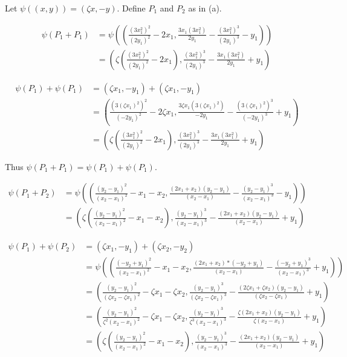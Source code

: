 \documentclass{article}
\begin{document}
Let $\psi((x,y)) = (\zeta x, -y)$. Define $P_1$ and $P_2$ as in (a).

\begin{align*}
\psi(P_1+P_1) &=
\psi \left(
	\left(
		\frac{(3x_1^2)^2}{(2y_1)^2}-2x_1,
		\frac{3x_1(3x_1^2)}{2y_1}-\frac{(3x_1^2)^3}{(2y_1)^3}-y_1
	\right)
\right) \\
&= \left(
	\zeta \left(\frac{(3x_1^2)^2}{(2y_1)^2}-2x_1 \right),
	\frac{(3x_1^2)^3}{(2y_1)^3} - \frac{3x_1(3x_1^2)}{2y_1} + y_1
\right)
\end{align*}

\begin{align*}
\psi(P_1)+\psi(P_1) &= (\zeta x_1,-y_1) + (\zeta x_1,-y_1) \\
&= \left(
	\frac{(3(\zeta x_1)^2)^2}{(-2y_1)^2}-2\zeta x_1,
	\frac{3\zeta x_1(3(\zeta x_1)^2)}{-2y_1}-\frac{(3 (\zeta x_1)^2)^3}{(-2y_1)^3}+y_1
\right) \\
&= \left(
	\zeta \left( \frac{(3x_1^2)^2}{(2y_1)^2}-2x_1 \right),
	\frac{(3x_1^2)^3}{(2y_1)^3} - \frac{3x_1(3x_1^2)}{2y_1} + y_1
\right)
\end{align*}

Thus $\psi(P_1+P_1) = \psi(P_1) + \psi(P_1)$.

\begin{align*}
\psi(P_1+P_2) &= 
\psi \left(
	\left(
		\frac{(y_2-y_1)^2}{(x_2-x_1)^2}-x_1-x_2,
		\frac{(2x_1+x_2)(y_2-y_1)}{(x_2-x_1)}-\frac{(y_2-y_1)^3}{(x_2-x_1)^3}-y_1
	\right)
\right) \\
&= \left(
	\zeta \left(\frac{(y_2-y_1)^2}{(x_2-x_1)^2}-x_1-x_2\right),
	\frac{(y_2-y_1)^3}{(x_2-x_1)^3} - \frac{(2x_1+x_2)(y_2-y_1)}{(x_2-x_1)} + y_1
\right)
\end{align*}

\begin{align*}
\psi(P_1) + \psi(P_2) &= (\zeta x_1, -y_1) + (\zeta x_2, -y_2) \\
&=
\psi\left( 
	\left(
		\frac{(-y_2+y_1)^2}{( x_2 -  x_1)^2}- x_1-  x_2,
		\frac{(2 x_1+ x_2)*(-y_2+y_1)}{(x_2-x_1)}-\frac{(-y_2+y_1)^3}{( x_2- x_1)^3}+y_1
	\right)
\right) \\
&= \left(
	\frac{(y_2-y_1)^2}{(\zeta x_2-\zeta x_1)^2}-\zeta x_1-\zeta x_2,
	\frac{(y_2-y_1)^3}{(\zeta x_2-\zeta x_1)^3} - \frac{(2\zeta x_1+\zeta x_2)(y_2-y_1)}{(\zeta x_2-\zeta x_1)} + y_1
\right)
\\
&=
\left(
	\frac{(y_2-y_1)^2}{\zeta^2(x_2-x_1)^2}-\zeta x_1-\zeta x_2,
	\frac{(y_2-y_1)^3}{\zeta^3(x_2-x_1)^3} - \frac{\zeta(2x_1+x_2)(y_2-y_1)}{\zeta(x_2-x_1)} + y_1
\right) \\
&=
\left(
	\zeta \left( \frac{(y_2-y_1)^2}{(x_2-x_1)^2}-x_1-x_2 \right),
	\frac{(y_2-y_1)^3}{(x_2-x_1)^3} - \frac{(2x_1+x_2)(y_2-y_1)}{(x_2-x_1)} + y_1
\right)
\end{align*}
\end{document}
